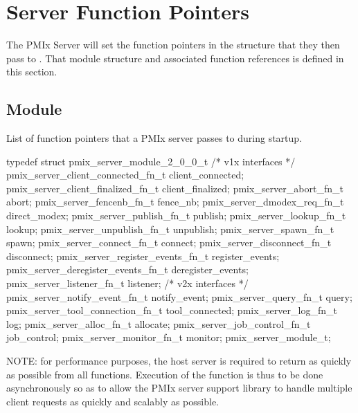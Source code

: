 \section{Server Function Pointers}

The PMIx Server will set the function pointers in the  structure that they then pass to .
That module structure and associated function references is defined in this section.

\subsection{ Module}

\summary

List of function pointers that a PMIx server passes to  during startup.

\format

\cspecificstart
\begin{codepar}
typedef struct pmix_server_module_2_0_0_t {
    /* v1x interfaces */
    pmix_server_client_connected_fn_t   client_connected;
    pmix_server_client_finalized_fn_t   client_finalized;
    pmix_server_abort_fn_t              abort;
    pmix_server_fencenb_fn_t            fence_nb;
    pmix_server_dmodex_req_fn_t         direct_modex;
    pmix_server_publish_fn_t            publish;
    pmix_server_lookup_fn_t             lookup;
    pmix_server_unpublish_fn_t          unpublish;
    pmix_server_spawn_fn_t              spawn;
    pmix_server_connect_fn_t            connect;
    pmix_server_disconnect_fn_t         disconnect;
    pmix_server_register_events_fn_t    register_events;
    pmix_server_deregister_events_fn_t  deregister_events;
    pmix_server_listener_fn_t           listener;
    /* v2x interfaces */
    pmix_server_notify_event_fn_t       notify_event;
    pmix_server_query_fn_t              query;
    pmix_server_tool_connection_fn_t    tool_connected;
    pmix_server_log_fn_t                log;
    pmix_server_alloc_fn_t              allocate;
    pmix_server_job_control_fn_t        job_control;
    pmix_server_monitor_fn_t            monitor;
} pmix_server_module_t;
\end{codepar}
\cspecificend

\descr

NOTE: for performance purposes, the host server is required to return as quickly as possible from all functions.
Execution of the function is thus to be done asynchronously so as to allow the PMIx server support library to handle multiple client requests as quickly and scalably as possible.

